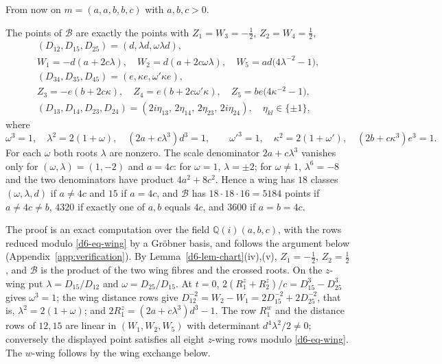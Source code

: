 From now on $m=(a,a,b,b,c)$ with $a,b,c>0$.

\begin{lemma}\label{d6-lem-atlas}
The points of $\mathcal B$ are exactly the points with $Z_1=W_3=-\frac12$, $Z_2=W_4=\frac12$,
\begin{gather*}
  (D_{12},D_{15},D_{25})=(d,\lambda d,\omega\lambda d),\\
  W_1=-d(a+2c\lambda),\quad
  W_2=d(a+2c\omega\lambda),\quad W_5=ad\bigl(4\lambda^{-2}-1\bigr),\\
  (D_{34},D_{35},D_{45})=(e,\kappa e,\omega'\kappa e),\\
  Z_3=-e(b+2c\kappa),\quad
  Z_4=e(b+2c\omega'\kappa),\quad Z_5=be\bigl(4\kappa^{-2}-1\bigr),\\
  (D_{13},D_{14},D_{23},D_{24})=(2i\eta_{13},\,2\eta_{14},\,2\eta_{23},\,2i\eta_{24}),\quad
  \eta_{kl}\in\{\pm1\},
\end{gather*}
where
\begin{equation}\label{d6-eq-wing}
  \omega^3=1,\quad\lambda^2=2(1+\omega),\quad(2a+c\lambda^3)d^3=1,\qquad
  \omega'^3=1,\quad\kappa^2=2(1+\omega'),\quad(2b+c\kappa^3)e^3=1.
\end{equation}
For each $\omega$ both roots $\lambda$ are nonzero.  The scale denominator $2a+c\lambda^3$
vanishes only for $(\omega,\lambda)=(1,-2)$ and $a=4c$: for $\omega=1$, $\lambda=\pm2$; for
$\omega\ne1$, $\lambda^6=-8$ and the two denominators have product $4a^2+8c^2$.  Hence a wing
has $18$ classes $(\omega,\lambda,d)$ if $a\ne4c$ and $15$ if $a=4c$, and $\mathcal B$ has
$18\cdot18\cdot16=5184$ points if $a\ne4c\ne b$, $4320$ if exactly one of $a,b$ equals $4c$, and
$3600$ if $a=b=4c$.
\end{lemma}
The proof is an exact computation over the field $\mathbb Q(i)(a,b,c)$, with the rows reduced
modulo \eqref{d6-eq-wing} by a Gr\"obner basis, and follows the argument below
(Appendix~\ref{app:verification}).  By Lemma~\ref{d6-lem-chart}(iv),(v), $Z_1=-\frac12$,
$Z_2=\frac12$, and $\mathcal B$ is the product of the two wing fibres and the crossed roots.
On the $z$-wing put $\lambda=D_{15}/D_{12}$ and $\omega=D_{25}/D_{15}$.  At $t=0$,
$2(R^z_1+R^z_2)/c=D_{15}^3-D_{25}^3$ gives $\omega^3=1$; the wing distance rows give
$D_{12}^{-2}=W_2-W_1=2D_{15}^{-2}+2D_{25}^{-2}$,
that is, $\lambda^2=2(1+\omega)$; and $2R^z_1=(2a+c\lambda^3)d^3-1$.  The row $R^w_1$ and the
distance rows of $12,15$ are linear in $(W_1,W_2,W_5)$ with determinant $d^4\lambda^2/2\ne0$;
conversely the displayed point satisfies all eight $z$-wing rows modulo \eqref{d6-eq-wing}.  The
$w$-wing follows by the wing exchange below.

